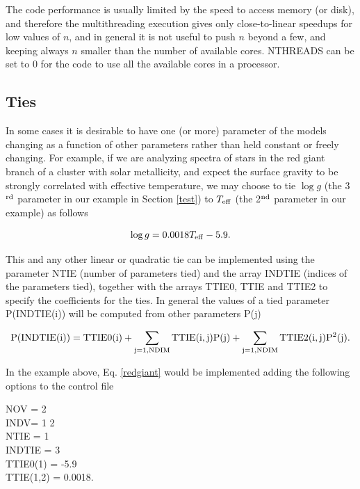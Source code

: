 \documentclass[12pt]{article}
\begin{document}
The code performance is usually limited by the speed to access memory (or disk),
and therefore the multithreading execution gives only close-to-linear speedups 
for low values of $n$, and in general it is not useful to push $n$ beyond a few,
and keeping always $n$ smaller than the number of available cores. NTHREADS can
be set to 0 for the code to use all the available cores in a processor.

\subsection{Ties}

In some cases it is desirable to have one (or more) parameter of the models 
changing as a function of other parameters rather than held constant or 
freely changing. For example, 
if we are analyzing spectra of stars in the red giant branch of a cluster with solar
metallicity, and expect the surface gravity to be strongly correlated with effective
temperature, we may choose to tie $\log g$ (the 3$^{\rm rd}$ parameter in our example 
in Section \ref{test}) to $T_{\rm eff}$ (the 2$^{\rm nd}$ parameter in our example) 
as follows

\begin{equation}
\log g = 0.0018 T_{\rm eff} -5.9.
\label{redgiant}
\end{equation}

This and any other linear or quadratic tie can be implemented using the parameter NTIE 
(number of parameters tied) and the array INDTIE (indices of the parameters tied), 
together with the arrays TTIE0, TTIE and TTIE2 to specify the coefficients for the ties.
In general the values of a tied parameter P(INDTIE(i)) will be computed from other 
parameters P(j)


\begin{equation}
{\rm P(INDTIE(i))} = {\rm TTIE0(i)} + \sum_{\rm j=1,NDIM} {\rm TTIE(i,j) P(j)} + 
\sum_{\rm j=1,NDIM} {\rm TTIE2(i,j)} {\rm P}^2{\rm (j)}.
\end{equation}


In the example above, Eq. \ref{redgiant} would be implemented adding the following 
options to the control file

\noindent
 NOV = 2 \\
 INDV= 1 2 \\
 NTIE = 1 \\
 INDTIE = 3 \\
 TTIE0(1) = -5.9 \\
 TTIE(1,2) = 0.0018. \\
 
\end{document}
